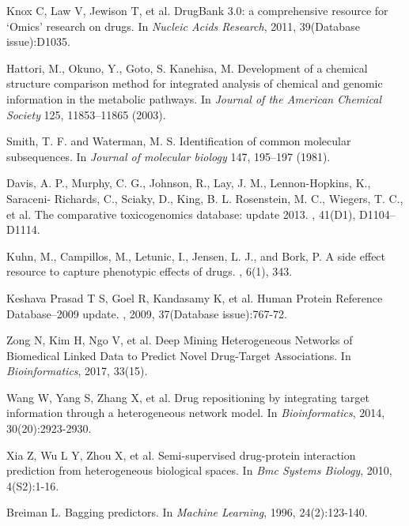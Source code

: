 \documentclass[conference]{IEEEtran}
\begin{document}
\begin{thebibliography}{10}
Knox C, Law V, Jewison T, et al. 
\newblock DrugBank 3.0: a comprehensive resource for ‘Omics’ research on drugs. 
\newblock In {\em Nucleic Acids Research}, 2011, 39(Database issue):D1035.

Hattori, M., Okuno, Y., Goto, S.  Kanehisa, M.
\newblock Development of a chemical structure comparison method for integrated analysis of chemical and genomic information in the metabolic pathways. 
\newblock In {\em Journal of the American Chemical Society} 125, 11853–11865 (2003).


Smith, T. F. and Waterman, M. S. 
\newblock Identification of common molecular subsequences. 
\newblock In {\em Journal of molecular biology} 147, 195–197 (1981).


Davis, A. P., Murphy, C. G., Johnson, R., Lay, J. M., Lennon-Hopkins, K., Saraceni- Richards, C., Sciaky, D., King, B. L. Rosenstein, M. C., Wiegers, T. C., et al. 
\newblock The comparative toxicogenomics database: update 2013.
, 41(D1), D1104–D1114.


Kuhn, M., Campillos, M., Letunic, I., Jensen, L. J., and Bork, P.  
\newblock A side effect resource to capture phenotypic effects of drugs. 
, 6(1), 343.

Keshava Prasad T S, Goel R, Kandasamy K, et al. 
\newblock Human Protein Reference Database--2009 update.
, 2009, 37(Database issue):767-72.


Zong N, Kim H, Ngo V, et al. 
\newblock Deep Mining Heterogeneous Networks of Biomedical Linked Data to Predict Novel Drug-Target Associations. 
\newblock In {\em Bioinformatics}, 2017, 33(15).


Wang W, Yang S, Zhang X, et al. 
\newblock Drug repositioning by integrating target information through a heterogeneous network model. 
\newblock In {\em Bioinformatics}, 2014, 30(20):2923-2930.



Xia Z, Wu L Y, Zhou X, et al. 
\newblock Semi-supervised drug-protein interaction prediction from heterogeneous biological spaces. 
\newblock In {\em Bmc Systems Biology}, 2010, 4(S2):1-16.


Breiman L. 
\newblock Bagging predictors. 
\newblock In {\em Machine Learning}, 1996, 24(2):123-140.

\end{thebibliography}
\end{document}
